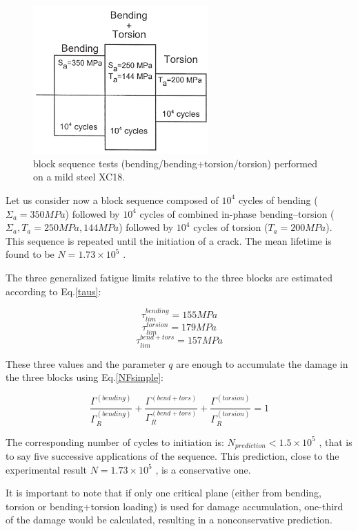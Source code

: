 \documentclass[3p,times,procedia,number]{elsarticle}
\begin{document}
 \begin{figure}[h!]
 	\centering
 	\includegraphics[width=0.6\textwidth]{figures//block.png} 
 	\caption{block sequence tests (bending/bending+torsion/torsion) performed on a mild
 		steel XC18.}
 	\label{block}
 \end{figure} 
 
 Let us consider now a block sequence composed of
 $10^4$ cycles of bending ($\Sigma_a =350 MPa$) followed by $10^4$
 cycles of combined in-phase bending–torsion ($\Sigma_a ,T_a =250 MPa, 144 MPa$)
 followed by $10^4$ cycles of torsion ($T_a =200 MPa$). This
 sequence is repeated until the initiation of a crack. The
 mean lifetime is found to be $N=1.73×10^5$ .
 
  The three generalized fatigue
  limits relative to the three blocks are estimated according
  to Eq.\eqref{taus}:
  
 $$\tau_{lim}^{bending}=155 MPa$$   $$\tau_{lim}^{torsion}=179 MPa$$  $$\tau_{lim}^{bend+tors}=157 MPa$$
  
  
 These three values and the parameter $q$ are enough to
 accumulate the damage in the three blocks using Eq.\eqref{NFsimple}:
 
 
 $$\frac{\Gamma^{(bending)}}{\Gamma_R^{(bending)}}+\frac{\Gamma^{(bend+tors)}}{\Gamma_R^{(bend+tors)}}+\frac{\Gamma^{(torsion)}}{\Gamma_R^{(torsion)}}=1$$
 
 The corresponding number of cycles to initiation is:
 $N_{prediction} <1.5×10^5$ , that is to say five successive applications of the sequence. This prediction, close to the experimental result $N=1.73×10^5$ , is a conservative one.
 
 It is important to note that if only one critical plane
 (either from bending, torsion or bending+torsion
 loading) is used for damage accumulation, one-third of
 the damage would be calculated, resulting in a nonconservative prediction.
 
\end{document}
